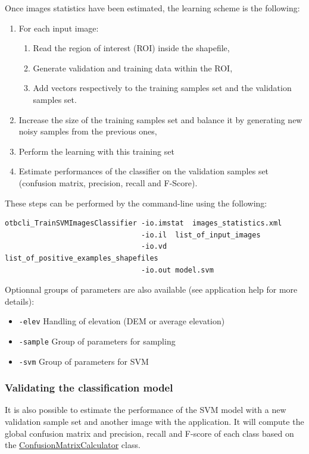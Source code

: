 Once images statistics have been estimated, the learning scheme is the following:
\begin{enumerate}
  \item For each input image:
  \begin{enumerate}
    \item Read the region of interest (ROI) inside the shapefile,
    \item Generate validation and training data within the ROI,
    \item Add vectors respectively to the training samples set and the validation
    samples set.
  \end{enumerate}
  \item Increase the size of the training samples set and balance it by
  generating new noisy samples from the previous ones,
  \item Perform the learning with this training set
  \item Estimate performances of the classifier on the validation samples set
  (confusion matrix, precision, recall and F-Score).
\end{enumerate}

These steps can be performed by the 
command-line using the following:

\begin{verbatim}
otbcli_TrainSVMImagesClassifier -io.imstat  images_statistics.xml
                                -io.il  list_of_input_images
                                -io.vd  list_of_positive_examples_shapefiles
                                -io.out model.svm
\end{verbatim}

Optionnal groups of parameters are also available (see application help for
more details):
\begin{itemize}
\item \verb?-elev? Handling of elevation (DEM or average elevation)
\item \verb?-sample? Group of parameters for sampling
\item \verb?-svm? Group of parameters for SVM
\end{itemize}

\subsubsection{Validating the classification model}
It is also possible to estimate the performance of the SVM model with a
new validation sample set and another image with the
 application. It will compute
the global confusion matrix and precision, recall and F-score of each
class based on the \href{http://www.orfeo-toolbox.org/doxygen-current/classotb_1_1ConfusionMatrixCalculator.html}{ConfusionMatrixCalculator}
class.

